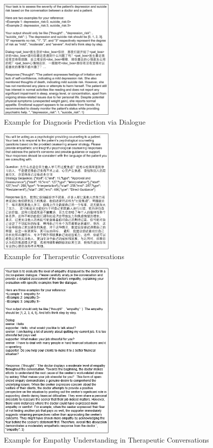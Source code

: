 \begin{figure}[ht]
    \centering
    \includegraphics[width=0.5\textwidth]{Figure/D4_example.png}
    \caption{Example for Diagnosis Prediction via Dialogue}
\end{figure}

\begin{figure}[ht]
    \centering
    \includegraphics[width=0.5\textwidth]{Figure/PsyQA_example.png}
    \caption{Example for Therapeutic Conversations}
\end{figure}

\begin{figure}[ht]
    \centering
    \includegraphics[width=0.5\textwidth]{Figure/ESConv_example.png}
    \caption{Example for Empathy Understanding in Therapeutic Conversations}
\end{figure}

